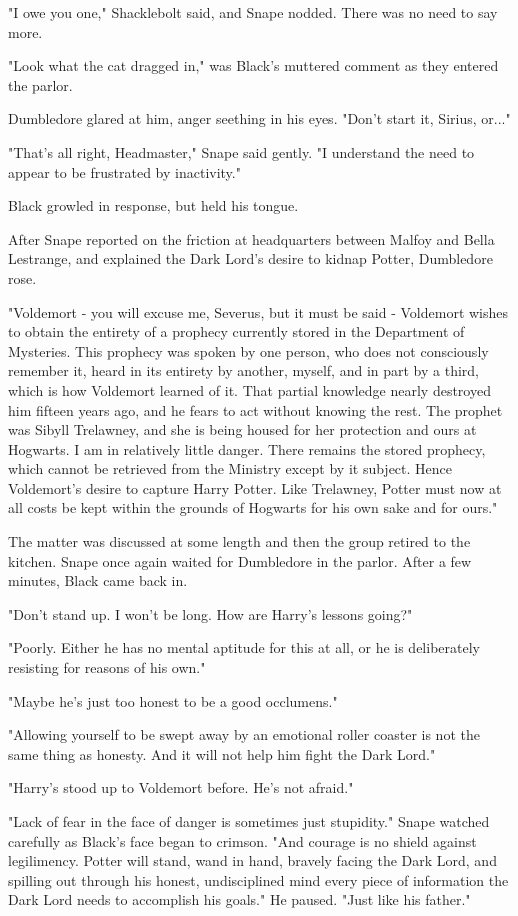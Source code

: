 \documentclass[a4paper,11pt]{article}
\begin{document}
"I owe you one," Shacklebolt said, and Snape nodded. There was no need to say more.

"Look what the cat dragged in," was Black's muttered comment as they entered the parlor.

Dumbledore glared at him, anger seething in his eyes. "Don't start it, Sirius, or..."

"That's all right, Headmaster," Snape said gently. "I understand the need to appear to be frustrated by inactivity."

Black growled in response, but held his tongue.

After Snape reported on the friction at headquarters between Malfoy and Bella Lestrange, and explained the Dark Lord's desire to kidnap Potter, Dumbledore rose.

"Voldemort - you will excuse me, Severus, but it must be said - Voldemort wishes to obtain the entirety of a prophecy currently stored in the Department of Mysteries. This prophecy was spoken by one person, who does not consciously remember it, heard in its entirety by another, myself, and in part by a third, which is how Voldemort learned of it. That partial knowledge nearly destroyed him fifteen years ago, and he fears to act without knowing the rest. The prophet was Sibyll Trelawney, and she is being housed for her protection and ours at Hogwarts. I am in relatively little danger. There remains the stored prophecy, which cannot be retrieved from the Ministry except by it subject. Hence Voldemort's desire to capture Harry Potter. Like Trelawney, Potter must now at all costs be kept within the grounds of Hogwarts for his own sake and for ours."

The matter was discussed at some length and then the group retired to the kitchen. Snape once again waited for Dumbledore in the parlor. After a few minutes, Black came back in.

"Don't stand up. I won't be long. How are Harry's lessons going?"

"Poorly. Either he has no mental aptitude for this at all, or he is deliberately resisting for reasons of his own."

"Maybe he's just too honest to be a good occlumens."

"Allowing yourself to be swept away by an emotional roller coaster is not the same thing as honesty. And it will not help him fight the Dark Lord."

"Harry's stood up to Voldemort before. He's not afraid."

"Lack of fear in the face of danger is sometimes just stupidity." Snape watched carefully as Black's face began to crimson. "And courage is no shield against legilimency. Potter will stand, wand in hand, bravely facing the Dark Lord, and spilling out through his honest, undisciplined mind every piece of information the Dark Lord needs to accomplish his goals." He paused. "Just like his father."
\end{document}
